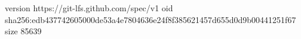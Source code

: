 version https://git-lfs.github.com/spec/v1
oid sha256:edb437742605000de53a4e7804636e24f8f385621457d655d0d9b00441251f67
size 85639
